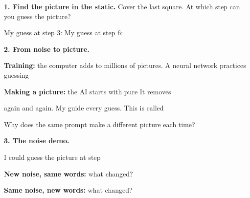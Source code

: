 \documentclass[11pt]{article}
\begin{document}
\partner


\vspace{0.4em}
{\large\textbf{1. Find the picture in the static.}} Cover the last square. At which step can you guess the picture?

\vspace{0.4em}
\begin{center}\end{center}

My guess at step 3:  \quad My guess at step 6: 

\vspace{1.0em}
{\large\textbf{2. From noise to picture.}}

\vspace{0.5em}
\textbf{Training:} the computer adds  to millions of pictures. A neural network practices guessing

\vspace{0.5em}

\vspace{0.7em}
\textbf{Making a picture:} the AI starts with pure  It removes 

\vspace{0.5em}
again and again. My  guide every guess. This is called 

\vspace{0.7em}
Why does the same prompt make a different picture each time? 

\vspace{0.5em}

\vspace{1.0em}
{\large\textbf{3. The noise demo.}}

\vspace{0.5em}
I could guess the picture at step 

\vspace{0.7em}
\textbf{New noise, same words:} what changed? 

\vspace{0.7em}
\textbf{Same noise, new words:} what changed? 
\end{document}
